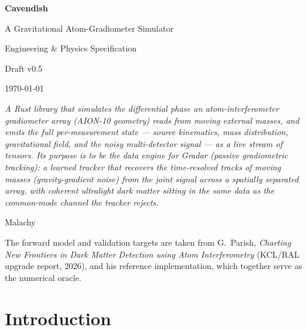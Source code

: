 \documentclass[11pt,a4paper]{article}
\theoremstyle{reqstyle}
\begin{document}
\begin{titlepage}
\centering
\vspace*{2.2cm}
{\Huge\bfseries Cavendish\par}
\vspace{0.5cm}
{\Large A Gravitational Atom-Gradiometer Simulator\par}
\vspace{0.3cm}
{\large Engineering \& Physics Specification\par}
\vspace{1.6cm}
{\large Draft v0.5\par}
\vspace{0.4cm}
{\normalsize\today\par}
\vspace{2.4cm}
\begin{minipage}{0.82\textwidth}
\small\itshape
A Rust library that simulates the differential phase an atom-interferometer gradiometer
array (AION-10 geometry) reads from moving external masses, and emits the full
per-measurement state --- source kinematics, mass distribution, gravitational field, and
the noisy multi-detector signal --- as a live stream of tensors. Its purpose is to be the
data engine for \emph{Gradar} (passive gradiometric tracking): a learned tracker that recovers the
time-resolved tracks of moving masses (gravity-gradient noise) from the joint signal across
a spatially separated array, with coherent ultralight dark matter sitting in the same data
as the common-mode channel the tracker rejects.
\end{minipage}
\vspace{2.4cm}

{\normalsize Malachy\par}
\vfill
{\footnotesize The forward model and validation targets are taken from G.\ Parish,
\emph{Charting New Frontiers in Dark Matter Detection using Atom Interferometry}
(KCL/RAL upgrade report, 2026), and his reference implementation, which together serve as
the numerical oracle.\par}
\end{titlepage}

\tableofcontents
\newpage

\section{Introduction}
\end{document}
